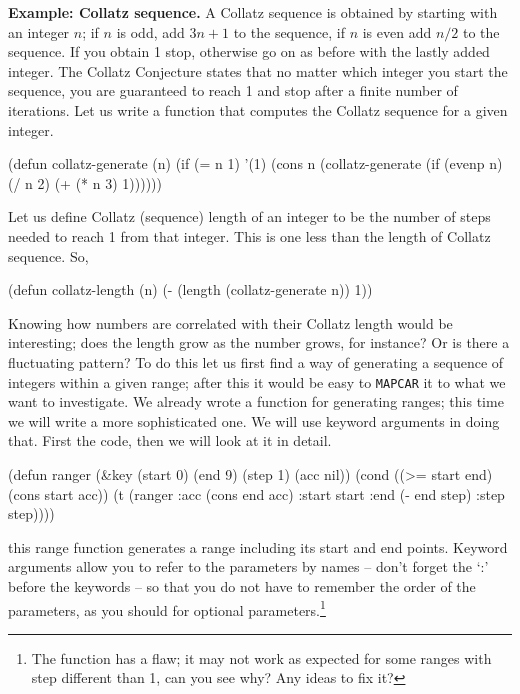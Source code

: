\documentclass[a4paper,11pt]{article}
\begin{document}
\begin{uenum}
\item {\bf Example: Collatz sequence.} A Collatz sequence is obtained by starting with an integer $n$; if $n$ is odd, add $3n + 1$ to the sequence, if $n$ is even add $n/2$ to the sequence. If you obtain 1 stop, otherwise go on as before with the lastly added integer. The Collatz Conjecture states that no matter which integer you start the sequence, you are guaranteed to reach 1 and stop after a finite number of iterations. Let us write a function that computes the Collatz sequence for a given integer.


\begin{lispcode}
(defun collatz-generate (n)
  (if (= n 1) 
	'(1)
	(cons n (collatz-generate (if (evenp n)
								(/ n 2)
								(+ (* n 3) 1))))))
\end{lispcode}

\begin{uenumi}

\item Let us define Collatz (sequence) length of an integer to be the number of steps needed to reach 1 from that integer. This is one less than the length of Collatz sequence. So,

\begin{lispcode}
(defun collatz-length (n)
  (- (length (collatz-generate n)) 1))
\end{lispcode}

\item Knowing how numbers are correlated with their Collatz length would be interesting; does the length grow as the number grows, for instance? Or is there a fluctuating pattern? To do this let us first find a way of generating a sequence of integers within a given range; after this it would be easy to \Verb+MAPCAR+ it to what we want to investigate. We already wrote a function for generating ranges; this time we will write a more sophisticated one. We will use keyword arguments in doing that. First the code, then we will look at it in detail.

\begin{lispcode}
(defun ranger (&key (start 0) (end 9) (step 1) (acc nil))
  (cond ((>= start end) (cons start acc))
		(t (ranger :acc (cons end acc)
				   :start start
				   :end (- end step)
				   :step step))))
\end{lispcode}
this range function generates a range including its start and end points. Keyword arguments allow you to refer to the parameters by names -- don't forget the `:' before the keywords -- so that you do not have to remember the order of the parameters, as you should for optional parameters.\footnote{The function has a flaw; it may not work as expected for some ranges with step different than 1, can you see why? Any ideas to fix it?}


\end{uenumi}
\end{uenum}
\end{document}
